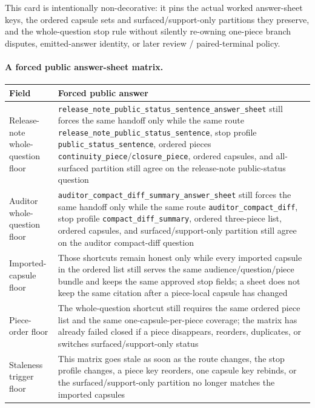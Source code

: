 \documentclass[11pt]{article}
\begin{document}
This card is intentionally non-decorative: it pins the actual worked answer-sheet keys, the ordered capsule sets and surfaced/support-only partitions they preserve, and the whole-question stop rule without silently re-owning one-piece branch disputes, emitted-answer identity, or later review / paired-terminal policy.\cite{series:workedexample}

\paragraph{A forced public answer-sheet matrix.}
\begin{table}[t]
\centering
\small
\begin{tabularx}{\linewidth}{@{}lX@{}}
\toprule
Field & Forced public answer \\
\midrule
Release-note whole-question floor & \nolinkurl{release_note_public_status_sentence_answer_sheet} still forces the same handoff only while the same route \nolinkurl{release_note_public_status_sentence}, stop profile \nolinkurl{public_status_sentence}, ordered pieces \nolinkurl{continuity_piece}/\nolinkurl{closure_piece}, ordered capsules, and all-surfaced partition still agree on the release-note public-status question \\
Auditor whole-question floor & \nolinkurl{auditor_compact_diff_summary_answer_sheet} still forces the same handoff only while the same route \nolinkurl{auditor_compact_diff}, stop profile \nolinkurl{compact_diff_summary}, ordered three-piece list, ordered capsules, and surfaced/support-only partition still agree on the auditor compact-diff question \\
Imported-capsule floor & Those shortcuts remain honest only while every imported capsule in the ordered list still serves the same audience/question/piece bundle and keeps the same approved stop fields; a sheet does not keep the same citation after a piece-local capsule has changed \\
Piece-order floor & The whole-question shortcut still requires the same ordered piece list and the same one-capsule-per-piece coverage; the matrix has already failed closed if a piece disappears, reorders, duplicates, or switches surfaced/support-only status \\
Staleness trigger floor & This matrix goes stale as soon as the route changes, the stop profile changes, a piece key reorders, one capsule key rebinds, or the surfaced/support-only partition no longer matches the imported capsules \\

\end{tabularx}
\end{table}
\end{document}
